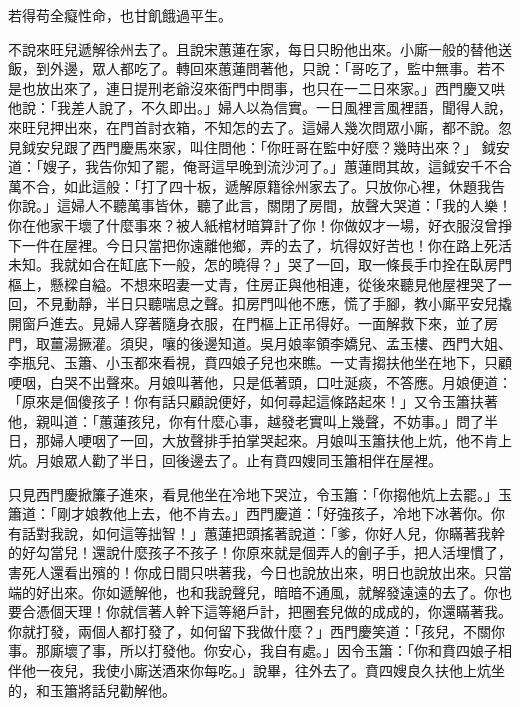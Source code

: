 若得苟全癡性命，也甘飢餓過平生。

不說來旺兒遞解徐州去了。且說宋蕙蓮在家，每日只盼他出來。小廝一般的替他送飯，到外邊，眾人都吃了。轉回來蕙蓮問著他，只說：「哥吃了，監中無事。若不是也放出來了，連日提刑老爺沒來衙門中問事，也只在一二日來家。」西門慶又哄他說：「我差人說了，不久即出。」婦人以為信實。一日風裡言風裡語，聞得人說，來旺兒押出來，在門首討衣箱，不知怎的去了。這婦人幾次問眾小廝，都不說。忽見鉞安兒跟了西門慶馬來家，叫住問他：「你旺哥在監中好麼？幾時出來？」 鉞安道：「嫂子，我告你知了罷，俺哥這早晚到流沙河了。」蕙蓮問其故，這鉞安千不合萬不合，如此這般：「打了四十板，遞解原籍徐州家去了。只放你心裡，休題我告你說。」這婦人不聽萬事皆休，聽了此言，關閉了房間，放聲大哭道：「我的人樂！你在他家干壞了什麼事來？被人紙棺材暗算計了你！你做奴才一場，好衣服沒曾掙下一件在屋裡。今日只當把你遠離他鄉，弄的去了，坑得奴好苦也！你在路上死活未知。我就如合在缸底下一般，怎的曉得？」哭了一回，取一條長手巾拴在臥房門樞上，懸樑自縊。不想來昭妻一丈青，住房正與他相連，從後來聽見他屋裡哭了一回，不見動靜，半日只聽喘息之聲。扣房門叫他不應，慌了手腳，教小廝平安兒撬開窗戶進去。見婦人穿著隨身衣服，在門樞上正吊得好。一面解救下來，並了房門，取薑湯撅灌。須臾，嚷的後邊知道。吳月娘率領李嬌兒、孟玉樓、西門大姐、李瓶兒、玉簫、小玉都來看視，賁四娘子兒也來瞧。一丈青搊扶他坐在地下，只顧哽咽，白哭不出聲來。月娘叫著他，只是低著頭，口吐涎痰，不答應。月娘便道：「原來是個傻孩子！你有話只顧說便好，如何尋起這條路起來！」又令玉簫扶著他，親叫道：「蕙蓮孩兒，你有什麼心事，越發老實叫上幾聲，不妨事。」問了半日，那婦人哽咽了一回，大放聲排手拍掌哭起來。月娘叫玉簫扶他上炕，他不肯上炕。月娘眾人勸了半日，回後邊去了。止有賁四嫂同玉簫相伴在屋裡。

只見西門慶掀簾子進來，看見他坐在冷地下哭泣，令玉簫：「你搊他炕上去罷。」玉簫道：「剛才娘教他上去，他不肯去。」西門慶道：「好強孩子，冷地下冰著你。你有話對我說，如何這等拙智！」蕙蓮把頭搖著說道：「爹，你好人兒，你瞞著我幹的好勾當兒！還說什麼孩子不孩子！你原來就是個弄人的劊子手，把人活埋慣了，害死人還看出殯的！你成日間只哄著我，今日也說放出來，明日也說放出來。只當端的好出來。你如遞解他，也和我說聲兒，暗暗不通風，就解發遠遠的去了。你也要合憑個天理！你就信著人幹下這等絕戶計，把圈套兒做的成成的，你還瞞著我。你就打發，兩個人都打發了，如何留下我做什麼？」西門慶笑道：「孩兒，不關你事。那廝壞了事，所以打發他。你安心，我自有處。」因令玉簫：「你和賁四娘子相伴他一夜兒，我使小廝送酒來你每吃。」說畢，往外去了。賁四嫂良久扶他上炕坐的，和玉簫將話兒勸解他。

